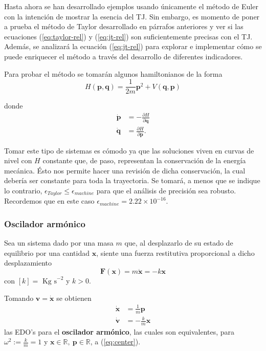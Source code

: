 Hasta ahora se han desarrollado ejemplos usando únicamente el método de Euler con la intención de mostrar la esencia del TJ. Sin embargo, es momento de poner a prueba el método de Taylor desarrollado en párrafos anteriores y ver si las ecuaciones (\ref{eq:taylor-rel}) y (\ref{eq:jt-rel}) son suficientemente precisas con el TJ. Además, se analizará la ecuación (\ref{eq:jt-rel}) para explorar e implementar cómo se puede enriquecer el método a través del desarrollo de diferentes indicadores.

Para probar el método se tomarán algunos hamiltonianos de la forma
\begin{equation}
 H(\mathbf{p},\mathbf{q}) = \frac{1}{2m}\mathbf{p}^2 + V(\mathbf{q},\mathbf{p})
 \label{eq:hamiltonian}
\end{equation}

donde
\begin{align}
 \dot{\mathbf{p}} &= -\frac{\partial{H}}{\partial{\mathbf{q}}} \nonumber \\
 \dot{\mathbf{q}} &= \frac{\partial{H}}{\partial{\mathbf{p}}}.
\label{eq:ham-rel}
\end{align}

Tomar este tipo de sistemas es cómodo ya que las soluciones viven en curvas de nivel con $H$ constante que, de paso, representan la conservación de la energía mecánica. Ésto nos permite hacer una revisión de dicha conservación, la cual debería ser constante para toda la trayectoria. Se tomará, a menos que se indique lo contrario, $\epsilon_{Taylor} \leq \epsilon_{machine}$ para que el análisis de precisión sea robusto. Recordemos que en este caso $\epsilon_{machine} = 2.22 \times 10^{-16}$.

\subsubsection{Oscilador armónico}
\label{sec:oscilador}
Sea un sistema dado por una masa $m$ que, al desplazarlo de su estado de equilibrio por una cantidad $\mathbf{x}$, siente una fuerza restitutiva proporcional a dicho desplazamiento
\begin{equation}
 \mathbf{F}(\mathbf{x}) = m \ddot{\mathbf{x}} = - k\mathbf{x}
 \label{eq:oscilador_force}
\end{equation}
con $[k] = \textrm{ Kg s}^{-2}$  y $k>0$. 

Tomando $\mathbf{v} = \dot{\mathbf{x}}$ se obtienen
\begin{align}
 \dot{\mathbf{x}} &= \frac{1}{m} \mathbf{p} \nonumber \\
 \dot{\mathbf{v}} &= - \frac{k}{m} \mathbf{x}
 \label{eq:oscilador_ode}
\end{align}
las EDO's para el \textbf{oscilador armónico}, las cuales son equivalentes, para $\omega^2 := \frac{k}{m} = 1$ y $\mathbf{x} \in \mathbb{R},\ \mathbf{p} \in \mathbb{R}$, a (\ref{eq:center}). 

